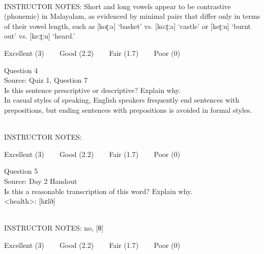 \documentclass[12pt]{article}
\begin{document}
~\\
INSTRUCTOR NOTES: Short and long vowels appear to be contrastive (phonemic) in Malayalam, as evidenced by minimal pairs that differ only in terms of their vowel length, such as [koʈːa] ‘basket’ vs. [koːʈːa] ‘castle’ or [keʈːu] ‘burnt out’ vs. [keːʈːu] ‘heard.’


\vfill
Excellent (3) ~~~ Good (2.2) ~~~ Fair (1.7) ~~~ Poor (0)
\newpage

{\large Question 4}\\

Source: Quiz 1, Question 7\\

Is this sentence prescriptive or descriptive? Explain why.\\

In casual styles of speaking, English speakers frequently end sentences with prepositions, but ending sentences with prepositions is avoided in formal styles.


~\\
INSTRUCTOR NOTES: 


\vfill
Excellent (3) ~~~ Good (2.2) ~~~ Fair (1.7) ~~~ Poor (0)
\newpage

{\large Question 5}\\

Source: Day 2 Handout\\

Is this a reasonable transcription of this word? Explain why.\\

<health>: {[hɛlð]}


~\\
INSTRUCTOR NOTES: no, [θ]


\vfill
Excellent (3) ~~~ Good (2.2) ~~~ Fair (1.7) ~~~ Poor (0)
\newpage

\begin{center}
\textbf{{\color{red}{\HUGE END OF EXAM}}}\\

\end{center}
\newpage

\begin{center}
\textbf{{\color{blue}{\HUGE START OF EXAM\\}}}

\textbf{{\color{blue}{\HUGE Student ID: 1715\\}}}

\textbf{{\color{blue}{\HUGE 1:30 - 1:45 PM\\}}}

\end{center}
\newpage
\end{document}
